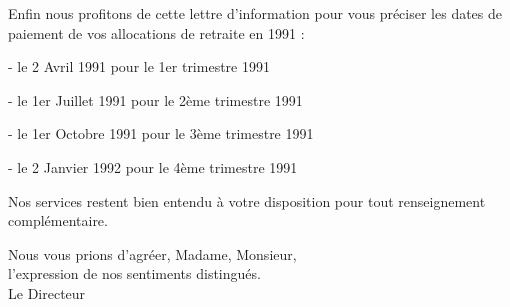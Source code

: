 Enfin nous profitons de cette lettre d'information pour vous préciser les dates de paiement de vos allocations de retraite en 1991 :

- le 2 Avril 1991 pour le 1er trimestre 1991

- le 1er Juillet 1991 pour le 2ème trimestre 1991

- le 1er Octobre 1991 pour le 3ème trimestre 1991

- le 2 Janvier 1992 pour le 4ème trimestre 1991

Nos services restent bien entendu à votre disposition pour tout renseignement complémentaire.

Nous vous prions d'agréer, Madame, Monsieur,\\
l'expression de nos sentiments distingués.\\

Le Directeur\\

\\
